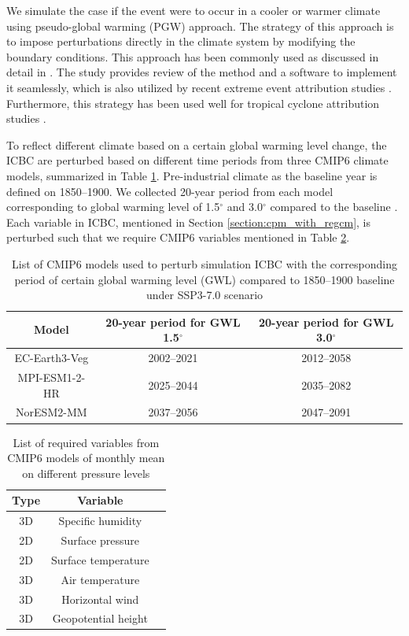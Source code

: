 We simulate the case if the event were to occur in a cooler or warmer climate using pseudo-global warming (PGW) approach. The strategy of this approach is to impose perturbations directly in the climate system by modifying the boundary conditions. This approach has been commonly used as discussed in detail in \citet{brogli2023pseudo}. The study provides review of the method and a software to implement it seamlessly, which is also utilized by recent extreme event attribution studies \citep{calvo2026human}. Furthermore, this strategy has been used well for tropical cyclone attribution studies \citep{patricola2018anthropogenic}.

To reflect different climate based on a certain global warming level change, the ICBC are perturbed based on different time periods from three CMIP6 climate models, summarized in Table \ref{table:cmip6}. Pre-industrial climate as the baseline year is defined on 1850--1900. We collected 20-year period from each model corresponding to global warming level of 1.5$^\circ$ and 3.0$^\circ$ compared to the baseline \citep{hauser2022transient}. Each variable in ICBC, mentioned in Section \ref{section:cpm_with_regcm}, is perturbed such that we require CMIP6 variables mentioned in Table \ref{table:cmip6_vars}.

\begin{table}[h] 
\centering
\begin{tabular}{ccc} 
\hline
\textbf{Model} & \textbf{20-year period for GWL 1.5$^\circ$} & \textbf{20-year period for GWL 3.0$^\circ$} \\
\hline
EC-Earth3-Veg & 2002--2021 & 2012--2058 \\
MPI-ESM1-2-HR & 2025--2044 & 2035--2082 \\
NorESM2-MM & 2037--2056 & 2047--2091 \\

\hline
\end{tabular}
\caption{List of CMIP6 models used to perturb simulation ICBC with the corresponding period of certain global warming level (GWL) compared to 1850--1900 baseline under SSP3-7.0 scenario \citep{hauser2022transient}}
\label{table:cmip6}
\end{table}

\begin{table}[h] 
\centering
\begin{tabular}{ccc} 
\hline
\textbf{Type} & \textbf{Variable} \\
\hline
3D	&Specific humidity \\
2D	&Surface pressure \\
2D	&Surface temperature \\
3D	&Air temperature \\
3D	&Horizontal wind \\
3D	&Geopotential height \\
\hline
\end{tabular}
\caption{List of required variables from CMIP6 models of monthly mean on different pressure levels}
\label{table:cmip6_vars}
\end{table}

